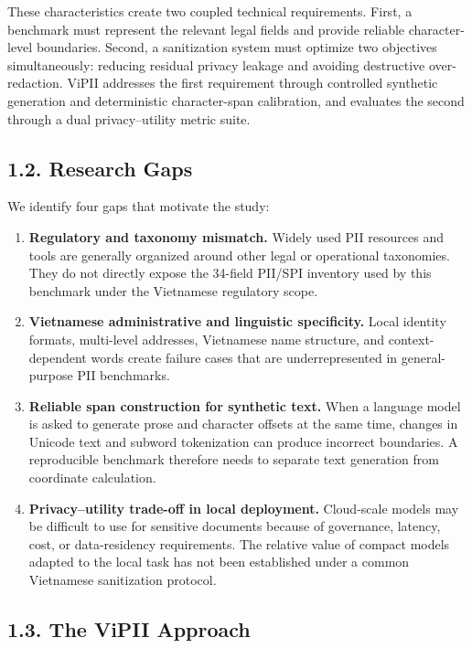 \documentclass[
]{article}
\providecommand{\tightlist}{%
  \setlength{\itemsep}{0pt}\setlength{\parskip}{0pt}}
\begin{document}
These characteristics create two coupled technical requirements. First,
a benchmark must represent the relevant legal fields and provide
reliable character-level boundaries. Second, a sanitization system must
optimize two objectives simultaneously: reducing residual privacy
leakage and avoiding destructive over-redaction. ViPII addresses the
first requirement through controlled synthetic generation and
deterministic character-span calibration, and evaluates the second
through a dual privacy--utility metric suite.

\subsection{1.2. Research Gaps}\label{research-gaps}

We identify four gaps that motivate the study:

\begin{enumerate}
\def\labelenumi{\arabic{enumi}.}
\tightlist
\item
  \textbf{Regulatory and taxonomy mismatch.} Widely used PII resources
  and tools are generally organized around other legal or operational
  taxonomies. They do not directly expose the 34-field PII/SPI inventory
  used by this benchmark under the Vietnamese regulatory scope.
\item
  \textbf{Vietnamese administrative and linguistic specificity.} Local
  identity formats, multi-level addresses, Vietnamese name structure,
  and context-dependent words create failure cases that are
  underrepresented in general-purpose PII benchmarks.
\item
  \textbf{Reliable span construction for synthetic text.} When a
  language model is asked to generate prose and character offsets at the
  same time, changes in Unicode text and subword tokenization can
  produce incorrect boundaries. A reproducible benchmark therefore needs
  to separate text generation from coordinate calculation.
\item
  \textbf{Privacy--utility trade-off in local deployment.} Cloud-scale
  models may be difficult to use for sensitive documents because of
  governance, latency, cost, or data-residency requirements. The
  relative value of compact models adapted to the local task has not
  been established under a common Vietnamese sanitization protocol.
\end{enumerate}

\subsection{1.3. The ViPII Approach}\label{the-vipii-approach}
\end{document}
